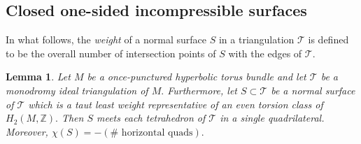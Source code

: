 \documentclass[a4paper]{gtart}
\def\tri{\mathcal{T}}
\def\manifold{M}
\def\Z{\mathbb{Z}}
\theoremstyle{plain}
\newtheorem{lemma}[theorem]{Lemma}
\theoremstyle{definition}
\theoremstyle{remark}
\numberwithin{equation}{section}
\begin{document}

\subsection{Closed one-sided incompressible surfaces}
\label{ssec:closedonesided}

In what follows, the {\em weight} of a normal surface $S$ in a triangulation $\tri$ is defined to be the overall number of intersection points of $S$ with the edges of $\tri$.

\begin{lemma}
  \label{lem:chiofS}
  Let $\manifold$ be a once-punctured hyperbolic torus bundle and let $\tri$ be a monodromy ideal triangulation of $\manifold.$ Furthermore, let $S \subset \tri$ be a normal surface of $\tri$ which is a taut least weight representative of an even torsion class of $H_2 (\manifold , \Z).$ Then $S$ meets each tetrahedron of $\tri$ in a single quadrilateral. Moreover, $\chi(S) = - (\# \textrm{ horizontal quads}).$
\end{lemma}
\end{document}
